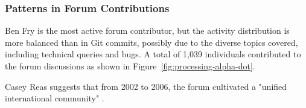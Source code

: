 



\subsubsection{Patterns in Forum Contributions}

Ben Fry is the most active forum contributor, but the activity distribution is more balanced than in Git commits, possibly due to the diverse topics covered, including technical queries and bugs. A total of 1,039 individuals contributed to the forum discussions as shown in Figure~\ref{fig:processing-alpha-dot}.

Casey Reas suggests that from 2002 to 2006, the forum cultivated a "unified international community" \parencite[331]{conradGraphicDesignPostdigital2021}. 


\clearpage

